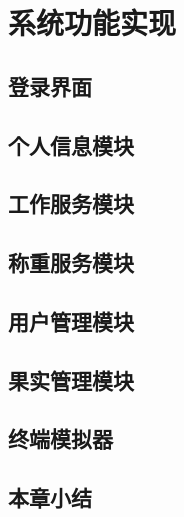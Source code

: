\chapter{系统功能实现}
\section{登录界面}
\section{个人信息模块}
\section{工作服务模块}
\section{称重服务模块}
\section{用户管理模块}
\section{果实管理模块}
\section{终端模拟器}
\section{本章小结}